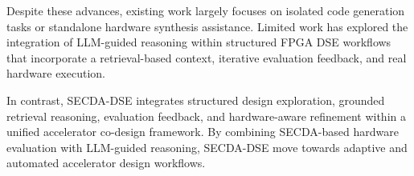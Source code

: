 Despite these advances, existing work largely focuses on isolated code generation tasks or standalone hardware synthesis assistance. Limited work has explored the integration of LLM-guided reasoning within structured FPGA DSE workflows that incorporate a retrieval-based context, iterative evaluation feedback, and real hardware execution.

In contrast, SECDA-DSE integrates structured design exploration, grounded retrieval reasoning, evaluation feedback, and hardware-aware refinement within a unified accelerator co-design framework. By combining SECDA-based hardware evaluation with LLM-guided reasoning, SECDA-DSE move towards adaptive and automated accelerator design workflows.